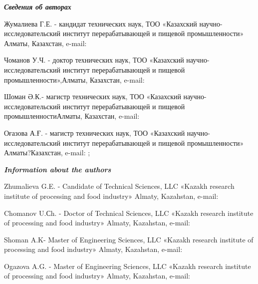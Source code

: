 \emph{{\bfseries Сведения об авторах}}

Жумалиева Г.Е. - кандидат технических наук, ТОО «Казахский
научно-исследовательский институт перерабатывающей и пищевой
промышленности» Алматы, Казахстан, e-mail:

\href{https://orcid.org/0000-0002-5028-465X}{}

Чоманов У.Ч. - доктор технических наук, ТОО «Казахский
научно-исследовательский институт перерабатывающей и пищевой
промышленности»,Алматы, Казахстан, e-mail:

\href{https://orcid.org/0000-0002-5594-8216}{}

Шоман Ә.К.- магистр технических наук, ТОО «Казахский
научно-исследовательский институт перерабатывающей и пищевой
промышленностиАлматы, Казахстан, e-mail: 

Оғазова А.Ғ. - магистр технических наук, ТОО «Казахский
научно-исследовательский институт перерабатывающей и пищевой
промышленности» Алматы?Казахстан, e-mail:
\href{mailto:o.aidana_01@mail.ru}{};


\emph{{\bfseries Information about the authors}}

Zhumalieva G.E. - Candidate of Technical Sciences, LLC «Kazakh research
institute of processing and food industry» Almaty, Kazahstan, e-mail:

Chomanov U.Сh. - Doctor of Technical Sciences, LLC «Kazakh research
institute of processing and food industry» Almaty, Kazahstan, e-mail:

Shoman A.K- Master of Engineering Sciences, LLC «Kazakh research
institute of processing and food industry» Almaty, Kazahstan, e-mail:
\href{mailto:shoman_a@mail.ru;\%20}{}

Ogazova A.G. - Master of Engineering Sciences, LLC «Kazakh research
institute of processing and food industry» Almaty, Kazahstan, e-mail:\
